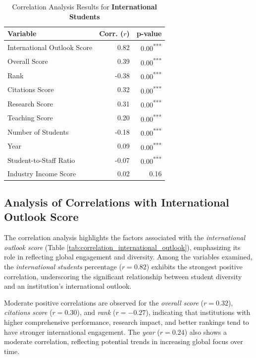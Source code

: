 \documentclass[sigconf]{acmart}
\begin{document}
\begin{table}[h!]
	\centering
	\caption{Correlation Analysis Results for \textbf{International Students}}
	\label{tab:correlation_intl_students}
	\begin{tabular}{|l|r|r|}
		\hline
		\textbf{Variable} & \textbf{Corr. ($r$)} & \textbf{p-value} \\
		\hline
		International Outlook Score & 0.82 & 0.00\textsuperscript{***} \\
		Overall Score & 0.39 & 0.00\textsuperscript{***} \\
		Rank & -0.38 & 0.00\textsuperscript{***} \\
		Citations Score & 0.32 & 0.00\textsuperscript{***} \\
		Research Score & 0.31 & 0.00\textsuperscript{***} \\
		Teaching Score & 0.20 & 0.00\textsuperscript{***} \\
		Number of Students & -0.18 & 0.00\textsuperscript{***} \\
		Year & 0.09 & 0.00\textsuperscript{***} \\
		Student-to-Staff Ratio & -0.07 & 0.00\textsuperscript{***} \\
		Industry Income Score & 0.02 & 0.16 \\
		\hline
	\end{tabular}
\end{table}



\subsection{Analysis of Correlations with International Outlook Score}

The correlation analysis highlights the factors associated with the \textit{international outlook score} (Table \ref{tab:correlation_international_outlook}), emphasizing its role in reflecting global engagement and diversity. Among the variables examined, the \textit{international students} percentage ($r = 0.82$) exhibits the strongest positive correlation, underscoring the significant relationship between student diversity and an institution's international outlook.

Moderate positive correlations are observed for the \textit{overall score} ($r = 0.32$), \textit{citations score} ($r = 0.30$), and \textit{rank} ($r = -0.27$), indicating that institutions with higher comprehensive performance, research impact, and better rankings tend to have stronger international engagement. The \textit{year} ($r = 0.24$) also shows a moderate correlation, reflecting potential trends in increasing global focus over time.
\end{document}
